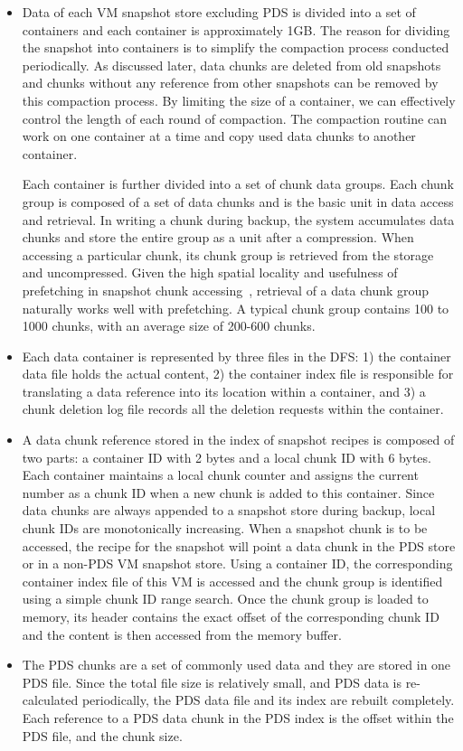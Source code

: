 \begin{itemize}
\item Data of each VM snapshot store excluding PDS is divided into a set of containers and 
each container is approximately 1GB. 
The reason for dividing the snapshot into containers is to simplify the compaction process
conducted periodically. As discussed later, data chunks are deleted from old snapshots
and chunks without any reference from other snapshots can be removed by this compaction process.
By limiting the size of a container, we can effectively control the length of each round of compaction.
The compaction  routine can work on one container at a time and copy used data chunks to another container. 

Each container is further divided into a set of chunk data groups. Each chunk group is composed of
a set of data chunks and is the basic unit in data access and retrieval. 
In writing a chunk during backup, the system accumulates data chunks and store the entire
group as a unit after a compression.
When accessing a particular chunk, its chunk group is retrieved from the storage
and uncompressed. Given the high spatial locality and usefulness of prefetching  in 
snapshot chunk accessing~\cite{Guo2011,foundation08},
retrieval of  a data chunk  group naturally works well with prefetching. 
A  typical chunk group contains 100 to 1000 chunks, with an average size of 
200-600 chunks.

\item Each data container is represented by three files in the DFS:
1) the container data file holds the actual content, 
2) the container index file is responsible for translating a data reference
into its location within a container, and 
3) a chunk deletion log file records all the deletion requests within  the container.

\item A data chunk reference stored in the index of snapshot recipes
is composed of two parts: a container ID with 2 bytes and a local chunk ID with 6 bytes.
Each container maintains a local  chunk counter and assigns the current number 
as a chunk ID  when  a new chunk is added to this  container. 
Since data chunks are always appended to a snapshot store during backup, 
local chunk IDs are monotonically increasing.
When a snapshot chunk is to be accessed, the recipe for the snapshot will point a data chunk
in the PDS store or in a non-PDS VM snapshot  store. 
Using  a container ID, the corresponding container index file of this VM is accessed and 
the chunk group is identified using a simple chunk ID range search. Once the chunk group is loaded to memory, 
its header contains the exact offset of the corresponding chunk ID and the content is then accessed from the memory buffer.

\item The PDS chunks are a set of commonly used data and they are stored in one PDS file.
Since the total file size is relatively small, and
PDS data is re-calculated periodically, the PDS data file and its index are rebuilt completely. 
Each reference to a PDS data chunk in the PDS index is the offset within the PDS file, and the chunk size.

\end{itemize}

